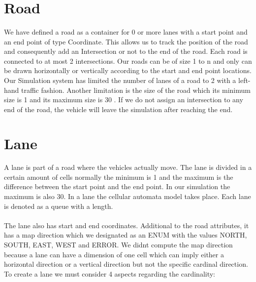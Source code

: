 \documentclass[a4paper]{article}
\begin{document}
\section{Road}

\paragraph{}
We have defined a road as a container for 0 or more lanes with a start point and an end point of type Coordinate. This allows us to track the position of the road and consequently add an Intersection or not to the end of the road. Each road is connected to at most 2 intersections. Our roads can be of size 1 to n and only can be drawn horizontally or vertically according to the start and end point locations. Our Simulation system has limited the number of lanes of a road to 2 with a left-hand traffic fashion. Another limitation is the size of the road which it\textsc{}s minimum size is 1 and its maximum size is 30 . If we do not assign an intersection to any end of the road, the vehicle will leave the simulation after reaching the end.

\section{Lane}

\paragraph{}
A lane is part of a road where the vehicles actually move. The lane is divided in a certain amount of cells normally the minimum is 1 and the maximum is the difference between the start point and the end point. In our simulation the maximum is also 30. In a lane the cellular automata model takes place. Each lane is denoted as a queue with a length.

\paragraph{}

The lane also has start and end coordinates. Additional to the road attributes, it has a map direction which we designated as an ENUM with the values NORTH, SOUTH, EAST, WEST and ERROR. We didn\textsc{}t compute the map direction because a lane can have a dimension of one cell which can imply either a horizontal direction or a vertical direction but not the specific cardinal direction. To create a lane we must consider 4 aspects regarding the cardinality:
\end{document}
